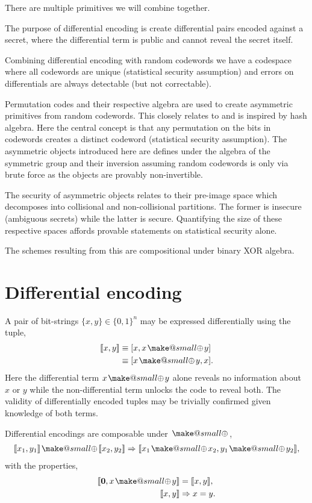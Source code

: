 \documentclass[twocolumn, aps, amsmath, amssymb, nofootinbib, superscriptaddress, longbibliography, doublefloatfix, table-of-contents, eqsecnum, rmp]{revtex4-2}
\makeatletter
\def\zerovec{\mathbf{0}}
\def\diff#1#2{\llbracket #1,#2\rrbracket}
\newcommand{\soplus}{{{\hspace{1pt}}{\mathbin{\mathpalette\make@small\oplus}}}{\hspace{1pt}}}
\newcommand{\make@small}[2]{%
  \vcenter{\hbox{%
    \scalebox{0.6}{$\m@th#1#2$}%
  }}%
}
\makeatother
\begin{document}
There are multiple primitives we will combine together.

The purpose of differential encoding is create differential pairs encoded against a secret, where the differential term is public and cannot reveal the secret itself.

Combining differential encoding with random codewords we have a codespace where all codewords are unique (statistical security assumption) and errors on differentials are always detectable (but not correctable).

Permutation codes and their respective algebra are used to create asymmetric primitives from random codewords. This closely relates to and is inspired by hash algebra. Here the central concept is that any permutation on the bits in codewords creates a distinct codeword (statistical security assumption). The asymmetric objects introduced here are defines under the algebra of the symmetric group and their inversion assuming random codewords is only via brute force as the objects are provably non-invertible.

The security of asymmetric objects relates to their pre-image space which decomposes into collisional and non-collisional partitions. The former is insecure (ambiguous secrets) while the latter is secure. Quantifying the size of these respective spaces affords provable statements on statistical security alone.

The schemes resulting from this are compositional under binary XOR algebra.

\section{Differential encoding}

A pair of bit-strings $\{x,y\}\in\{0,1\}^n$ may be expressed differentially using the tuple,
\begin{align}
	\diff{x}{y} &\equiv [x,x\soplus y] \nonumber\\
	&\equiv [x\soplus y,x].
\end{align}
Here the differential term $x\soplus y$ alone reveals no information about $x$ or $y$ while the non-differential term unlocks the code to reveal both. The validity of differentially encoded tuples may be trivially confirmed given knowledge of both terms.

Differential encodings are composable under $\soplus$,
\begin{align}
	\diff{x_1}{y_1} \soplus \diff{x_2}{y_2} \Rightarrow \diff{x_1\soplus x_2}{y_1 \soplus y_2},
\end{align}
with the properties,
\begin{align}
	\diff{\zerovec}{x\soplus y} &= \diff{x}{y}, \nonumber\\
	\diff{x}{y} &\Rightarrow x=y.
\end{align}
\end{document}
